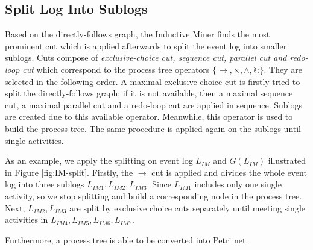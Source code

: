 \subsection{Split Log Into Sublogs}
Based on the directly-follows graph, the Inductive Miner finds the most prominent cut which is applied afterwards to split the event log into smaller sublogs. Cuts compose of \emph{exclusive-choice cut, sequence cut, parallel cut and redo-loop cut} which correspond to the process tree operators $ \{\rightarrow, \times, \land, \circlearrowright \}$. They are selected in the following order. A maximal exclusive-choice cut is firstly tried to split the directly-follows graph; if it is not available, then a maximal sequence cut, a  maximal parallel cut and a redo-loop cut are applied in sequence. Sublogs are created due to this available operator. Meanwhile, this operator is used to build the process tree. The same procedure is applied again on the sublogs until single activities.  

As an example, we apply the splitting on event log $L_{IM}$ and $G(L_{IM})$ illustrated in Figure \ref{fig:IM-split}. Firstly, the $\rightarrow$ cut is applied and divides the whole event log into three sublogs $L_{IM1},L_{IM2},L_{IM3}$. Since $L_{IM1}$ includes only one single activity, so we stop splitting and build a corresponding node in the process tree. Next, $L_{IM2},L_{IM3}$ are split by exclusive choice cuts separately until meeting single activities in $L_{IM4},L_{IM5},L_{IM6},L_{IM7}$.

Furthermore, a process tree is able to be converted into Petri net. 
